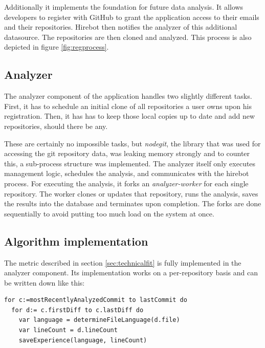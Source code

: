 Additionally it implements the foundation for future data analysis.
It allows developers to register with GitHub to grant the application
access to their emails and their repositories. Hirebot then notifies
the analyzer of this additional datasource. The repositories are then cloned
and analyzed. This process is also depicted in figure \ref{fig:regprocess}.


\subsection{Analyzer}
The analyzer component of the application handles two slightly different
tasks. First, it has to schedule an initial clone of all repositories
a user owns upon his registration. Then, it has has to keep those local
copies up to date and add new repositories, should there be any.


These are certainly no impossible tasks, but \textit{nodegit}, the library
that was used for accessing the git repository data, was
leaking memory strongly and to counter this, a sub-process structure was
implemented. The analyzer itself only executes management logic,
schedules the analysis, and communicates with the hirebot process.
For executing the analysis, it forks an \textit{analyzer-worker} for each
single repository. The worker clones or updates that repository,
runs the analysis, saves the results into the database and terminates
upon completion. The forks are done sequentially to avoid putting
too much load on the system at once.

\subsection{Algorithm implementation}
The metric described in section \ref{sec:technicalfit} is fully implemented
in the analyzer component. Its implementation works on a per-repository
basis and can be written down like this:

\begin{lstlisting}[frame=false]
for c:=mostRecentlyAnalyzedCommit to lastCommit do
  for d:= c.firstDiff to c.lastDiff do
    var language = determineFileLanguage(d.file)
    var lineCount = d.lineCount
    saveExperience(language, lineCount)
\end{lstlisting}

